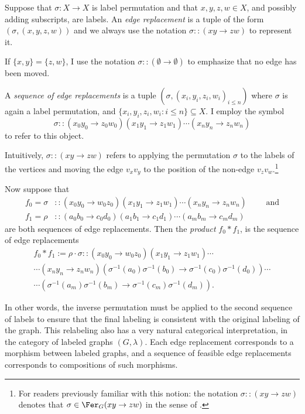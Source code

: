 \begin{definition}\label{def:fer-object}
    Suppose that $\sigma\colon X\to X$ is label permutation and that $x,y,z,w\in X$, and possibly adding subscripts, are labels.
    An \emph{edge replacement} is a tuple of the form $(\sigma, (x, y, z, w))$ and we always use the notation $\sigma::(xy\to zw)$ to represent it.

    If $\{x,y\}=\{z,w\}$, I use the notation $\sigma::(\emptyset\to\emptyset)$ to emphasize that no edge has been moved.

    A \emph{sequence of edge replacements} is a tuple $(\sigma,(x_i,y_i,z_i,w_i)_{i\leq n})$ where $\sigma$ is again a label permutation, and $\{x_i,y_i,z_i,w_i:i\leq n\}\subseteq X$.
    I employ the symbol $$\sigma::(x_0y_0\to z_0w_0)(x_1y_1\to z_1w_1)\cdots(x_ny_n\to z_nw_n)$$ to refer to this object.
\end{definition}

Intuitively, $\sigma::(xy\to zw)$ refers to applying the permutation $\sigma$ to the labels of the vertices and moving the edge $v_xv_y$ to the position of the non-edge $v_zv_w$.\footnote{For readers previously familiar with this notion: the notation $\sigma::(xy\to zw)$ denotes that $\sigma\in\Fer_G(xy\to zw)$ in the sense of \cite{Caro2020GraphsIU}.}

\begin{definition}\label{def:concatenation-fer}
    Now suppose that \begin{align*}
    f_0=\sigma&::(x_0y_0\to w_0z_0)(x_1y_1\to z_1w_1)\cdots(x_ny_n\to z_nw_n)\qquad\text{ and}\\
    f_1=\rho&::(a_0b_0\to c_0d_0)(a_1b_1\to c_1d_1)\cdots(a_mb_m\to c_md_m)
    \end{align*}
    are both sequences of edge replacements.
    Then the \emph{product} $f_0*f_1$, is the sequence of edge replacements \begin{align*}
        f_0*f_1:=\rho\cdot\sigma::(x_0y_0\to w_0z_0)(x_1y_1\to z_1w_1)\cdots\\
        \cdots(x_ny_n\to z_nw_n)(\sigma^{-1}(a_0)\sigma^{-1}(b_0)\to \sigma^{-1}(c_0)\sigma^{-1}(d_0))\cdots\\
        \cdots(\sigma^{-1}(a_m)\sigma^{-1}(b_m)\to\sigma^{-1}(c_m)\sigma^{-1}(d_m)).
    \end{align*}
\end{definition}

In other words, the inverse permutation must be applied to the second sequence of labels to ensure that the final labeling is consistent with the original labeling of the graph.
This relabeling also has a very natural categorical interpretation, in the category of labeled graphs $(G,\lambda)$.
Each edge replacement corresponds to a morphism between labeled graphs, and a sequence of feasible edge replacements corresponds to compositions of such morphisms.

